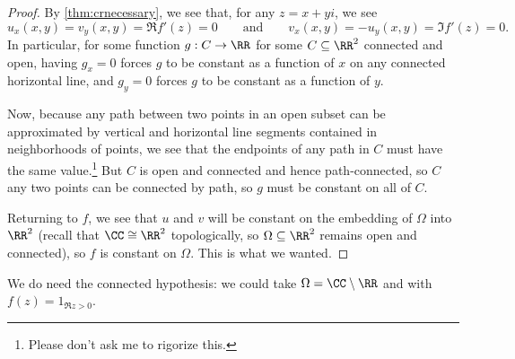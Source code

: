 \begin{proof}
	By \autoref{thm:crnecessary}, we see that, for any $z=x+yi$, we see
	\[u_x(x,y)=v_y(x,y)=\Re f'(z)=0\qquad\text{and}\qquad v_x(x,y)=-u_y(x,y)=\Im f'(z)=0.\]
	In particular, for some function $g:C\to\RR$ for some $C\subseteq\RR^2$ connected and open, having $g_x=0$ forces $g$ to be constant as a function of $x$ on any connected horizontal line, and $g_y=0$ forces $g$ to be constant as a function of $y$.

	Now, because any path between two points in an open subset can be approximated by vertical and horizontal line segments contained in neighborhoods of points, we see that the endpoints of any path in $C$ must have the same value.\footnote{Please don't ask me to rigorize this.} But $C$ is open and connected and hence path-connected, so $C$ any two points can be connected by path, so $g$ must be constant on all of $C$.

	Returning to $f$, we see that $u$ and $v$ will be constant on the embedding of $\Omega$ into $\RR^2$ (recall that $\CC\cong\RR^2$ topologically, so $\Omega\subseteq\RR^2$ remains open and connected), so $f$ is constant on $\Omega$. This is what we wanted.
\end{proof}
\begin{remark}
	We do need the connected hypothesis: we could take $\Omega=\CC\setminus\RR$ and with $f(z)=1_{\Re z>0}$.
\end{remark}